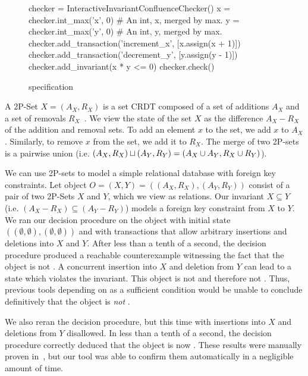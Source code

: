 \begin{figure}[ht]
  \begin{Python}[gobble=4]
    checker = InteractiveInvariantConfluenceChecker()
    x = checker.int_max('x', 0) # An int, x, merged by max.
    y = checker.int_max('y', 0) # An int, y, merged by max.
    checker.add_transaction('increment_x', [x.assign(x + 1)])
    checker.add_transaction('decrement_y', [y.assign(y - 1)])
    checker.add_invariant(x * y <= 0)
    checker.check()
  \end{Python}
  \caption{ specification}
\end{figure}

A 2P-Set $X = (A_X, R_X)$ is a set CRDT composed of a set of additions $A_X$
and a set of removals $R_X$~\cite{shapiro2011comprehensive}. We view the state
of the set $X$ as the difference $A_X - R_X$ of the addition and removal sets.
To add an element $x$ to the set, we add $x$ to $A_X$. Similarly, to remove $x$
from the set, we add it to $R_X$. The merge of two 2P-sets is a pairwise union
(i.e. $(A_X, R_X) \sqcup (A_Y, R_Y) = (A_X \cup A_Y, R_X \cup R_Y)$).

We can use 2P-sets to model a simple relational database with foreign key
constraints. Let object $O = (X, Y) = ((A_X, R_X), (A_Y, R_Y))$ consist of a
pair of two 2P-Sets $X$ and $Y$, which we view as relations. Our invariant $X
\subseteq Y$ (i.e. $(A_X - R_X) \subseteq (A_Y - R_Y)$) models a foreign key
constraint from $X$ to $Y$. We ran our decision procedure on the object with
initial state $((\emptyset, \emptyset), (\emptyset, \emptyset))$ and with
transactions that allow arbitrary insertions and deletions into $X$ and $Y$.
After less than a tenth of a second, the decision procedure produced a
reachable counterexample witnessing the fact that the object is not
\invariantconfluent{}. A concurrent insertion into $X$ and deletion from $Y$
can lead to a state which violates the invariant. This object is not
\invariantconfluent{} and therefore not \invariantclosed{}. Thus, previous
tools depending on \invariantclosure{} as a sufficient condition would be
unable to conclude definitively that the object is \emph{not}
\invariantconfluent{}.

We also reran the decision procedure, but this time with insertions into $X$
and deletions from $Y$ disallowed. In less than a tenth of a second, the
decision procedure correctly deduced that the object is now
\invariantconfluent{}. These results were manually proven
in~\cite{bailis2014coordination}, but our tool was able to confirm them
automatically in a negligible amount of time.

